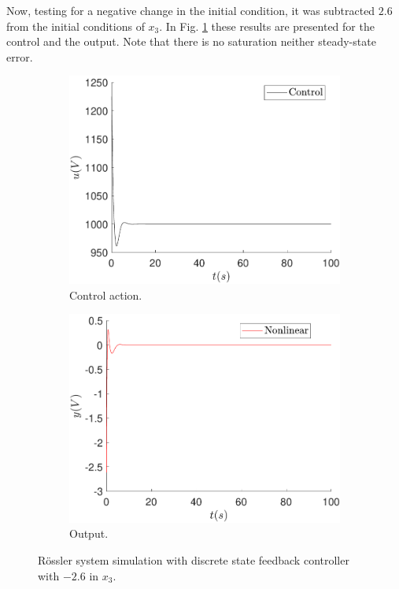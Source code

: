 	Now, testing for a negative change in the initial condition, it was subtracted $2.6$ from the initial conditions of $x_3$. In Fig. \ref{fig:feedback_ref0_x3-0_26} these results are presented for the control and the output. Note that there is no saturation neither steady-state error.
	\begin{figure}
        \centering
        \begin{subfigure}[b]{0.475\textwidth}
            \centering
            \includegraphics[scale=0.425]{files/feedback/Ref0/control_sfc_x30_-2_6_ref_0.pdf}
            \caption{Control action.}
        \end{subfigure}
        \vskip0.1cm
        \begin{subfigure}[b]{0.475\textwidth}   
            \centering 
            \includegraphics[scale=0.425]{files/feedback/Ref0/sfc_x30_-2_6_ref_0.pdf}
            \caption{Output.}
        \end{subfigure}
        \caption{Rössler system simulation with discrete state feedback controller with $-2.6$ in $x_3$.}
        \label{fig:feedback_ref0_x3-0_26}
	\end{figure}
	
